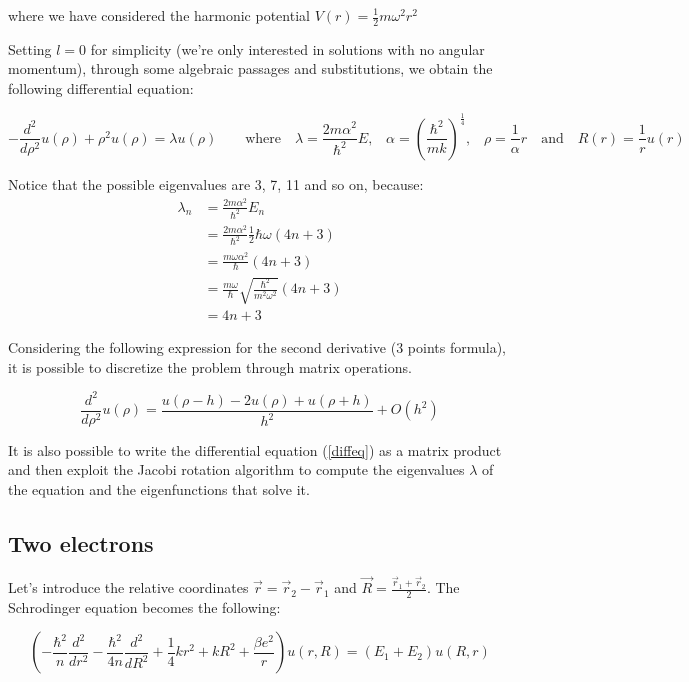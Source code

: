 \documentclass {article}
\begin{document}
where we have considered the harmonic potential $V(r)=\frac{1}{2} m \omega^2 r^2$

Setting $l=0$ for simplicity (we're only interested in solutions with no angular momentum), through some algebraic passages and substitutions, we obtain the following differential equation:

\begin{equation}
- \frac{d^2}{d \rho^2} u(\rho) +\rho^2 u(\rho)=\lambda u(\rho) \quad \quad \mbox{where} \quad \lambda=\frac{2 m \alpha^2}{\hbar^2}E \mbox{,} \quad \alpha=\left( \frac{\hbar^2}{mk} \right)^{\frac{1}{4}} \mbox{,} \quad \rho=\frac{1}{\alpha} r \quad \mbox{and} \quad R(r)=\frac{1}{r}u(r)
\end{equation}

Notice that the possible eigenvalues are 3, 7, 11 and so on, because:
\begin{align}
\lambda_n &= \frac{2 m \alpha^2}{\hbar^2}E_n \\
          &= \frac{2 m \alpha^2}{\hbar^2} \frac{1}{2}\hbar \omega (4n+3) \\
          &= \frac{m\omega \alpha^2}{\hbar}(4n + 3) \\
          &= \frac{m \omega}{\hbar}\sqrt{\frac{\hbar^2}{m^2 \omega^2}}(4n+3) \\
          &= 4n + 3
          \label{eq:seria}
\end{align}

Considering the following expression for the second derivative (3 points formula), it is possible to discretize the problem through matrix operations.

\begin{equation}
\frac{d^2}{d \rho^2} u(\rho)=\frac{u(\rho-h)-2 u(\rho)+u(\rho+h)}{h^2} +O(h^2)
\end{equation}

It is also possible to write the differential equation (\ref{diffeq}) as a matrix product and then exploit the Jacobi rotation algorithm to compute the eigenvalues $\lambda$ of the equation and the eigenfunctions that solve it.

\subsection{Two electrons}

Let's introduce the relative coordinates $\vec r=\vec r_2-\vec r_1$ and $\vec R=\frac{\vec r_1 + \vec r_2}{2}$. The Schrodinger equation becomes the following:

\begin{equation}
\left(- \frac{\hbar^2}{n} \frac{d^2}{dr^2}-\frac{\hbar^2}{4n} \frac{d^2}{dR^2}+\frac{1}{4} k r^2+kR^2+ \frac{\beta e^2}{r} \right)u(r, R)=\left(E_1 + E_2 \right) u(R, r)
\end{equation}
\end{document}

